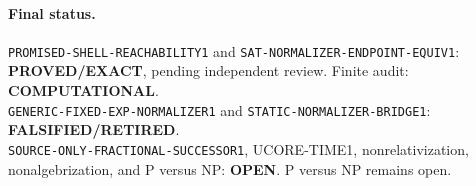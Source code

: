 \documentclass[11pt]{article}
\newcommand{\EXACT}{\textbf{PROVED/EXACT}}
\newcommand{\OPEN}{\textbf{OPEN}}
\newcommand{\RETIRED}{\textbf{FALSIFIED/RETIRED}}
\newcommand{\COMP}{\textbf{COMPUTATIONAL}}
\begin{document}
\paragraph{Final status.}
\texttt{PROMISED-SHELL-REACHABILITY1} and
\texttt{SAT-NORMALIZER-ENDPOINT-EQUIV1}: \EXACT, pending independent review.
Finite audit: \COMP.\\
\texttt{GENERIC-FIXED-EXP-NORMALIZER1} and
\texttt{STATIC-NORMALIZER-BRIDGE1}: \RETIRED.\\
\texttt{SOURCE-ONLY-FRACTIONAL-SUCCESSOR1}, UCORE-TIME1,
nonrelativization, nonalgebrization, and P versus NP: \OPEN.
P versus NP remains open.

\end{document}
